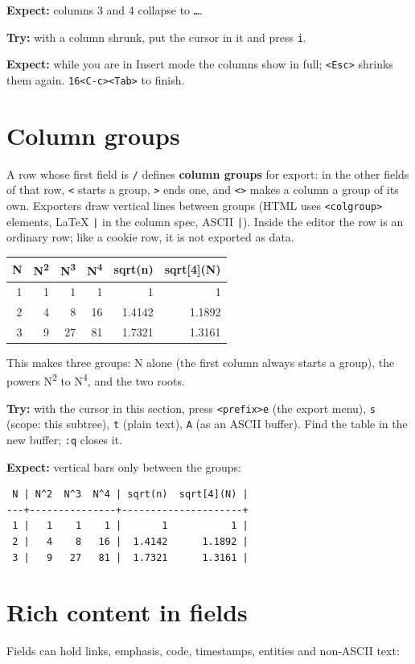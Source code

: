 \textbf{Expect:} columns 3 and 4 collapse to \texttt{…}.

\textbf{Try:} with a column shrunk, put the cursor in it and press \texttt{i}.

\textbf{Expect:} while you are in Insert mode the columns show in full; \texttt{<Esc>}
shrinks them again. \texttt{16<C-c><Tab>} to finish.
\section{Column groups}
\label{sec:orgd7ba314}
A row whose first field is \texttt{/} defines \textbf{column groups} for export: in the
other fields of that row, \texttt{<} starts a group, \texttt{>} ends one, and \texttt{<>} makes a
column a group of its own. Exporters draw vertical lines between groups
(HTML uses \texttt{<colgroup>} elements, \LaTeX{} \texttt{|} in the column spec, ASCII \texttt{|}).
Inside the editor the row is an ordinary row; like a cookie row, it is not
exported as data.

\begin{table}[htbp]
\label{tab:orge7575d4}
\centering
\begin{tabular}{r|rrr|rr|}
N & N\textsuperscript{2} & N\textsuperscript{3} & N\textsuperscript{4} & sqrt(n) & sqrt[4](N)\\
\hline
1 & 1 & 1 & 1 & 1 & 1\\
2 & 4 & 8 & 16 & 1.4142 & 1.1892\\
3 & 9 & 27 & 81 & 1.7321 & 1.3161\\
\end{tabular}
\end{table}

This makes three groups: N alone (the first column always starts a group),
the powers N\textsuperscript{2} to N\textsuperscript{4}, and the two roots.

\textbf{Try:} with the cursor in this section, press \texttt{<prefix>e} (the export
menu), \texttt{s} (scope: this subtree), \texttt{t} (plain text), \texttt{A} (as an ASCII
buffer). Find the table in the new buffer; \texttt{:q} closes it.

\textbf{Expect:} vertical bars only between the groups:
\begin{verbatim}
 N | N^2  N^3  N^4 | sqrt(n)  sqrt[4](N) |
---+---------------+---------------------+
 1 |   1    1    1 |       1           1 |
 2 |   4    8   16 |  1.4142      1.1892 |
 3 |   9   27   81 |  1.7321      1.3161 |
\end{verbatim}
\section{Rich content in fields}
\label{sec:org4373b75}
Fields can hold links, emphasis, code, timestamps, entities and non-ASCII
text:

